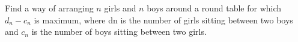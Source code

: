 Find a way of arranging $n$ girls and $n$ boys around a round table for which $d_n-c_n$ is maximum, where dn is the number of girls sitting between two boys and $c_n$ is the number of boys sitting between two girls.